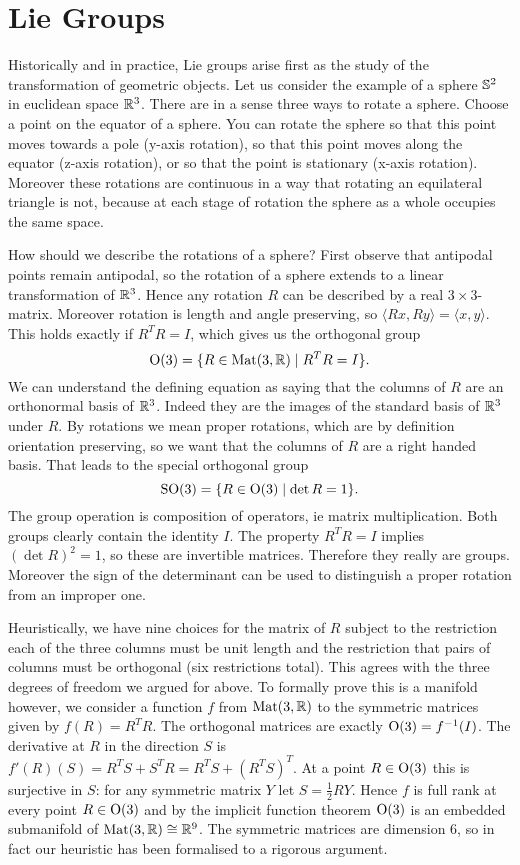 \chapter{Lie Groups}

Historically and in practice, Lie groups arise first as the study of the transformation of geometric objects.
Let us consider the example of a sphere $\mathbb{S}^2$ in euclidean space $\mathbb{R}^3$.
There are in a sense three ways to rotate a sphere.
Choose a point on the equator of a sphere.
You can rotate the sphere so that this point moves towards a pole (y-axis rotation), so that this point moves along the equator (z-axis rotation), or so that the point is stationary (x-axis rotation).
Moreover these rotations are continuous in a way that rotating an equilateral triangle is not, because at each stage of rotation the sphere as a whole occupies the same space.
 
How should we describe the rotations of a sphere?
First observe that antipodal points remain antipodal, so the rotation of a sphere extends to a linear transformation of $\mathbb{R}^3$.
Hence any rotation $R$ can be described by a real $3\times 3$-matrix.
Moreover rotation is length and angle preserving, so $\langle Rx, Ry \rangle = \langle x, y \rangle$.
This holds exactly if $R^TR = I$, which gives us the orthogonal group
\[
\mathrm{O}(3) = \{ R \in \operatorname{Mat}(3,\mathbb{R}) \mid R^TR = I \}.
\]
We can understand the defining equation as saying that the columns of $R$ are an orthonormal basis of $\mathbb{R}^3$.
Indeed they are the images of the standard basis of $\mathbb{R}^3$ under $R$.
By rotations we mean proper rotations, which are by definition orientation preserving, so we want that the columns of $R$ are a right handed basis.
That leads to the special orthogonal group
\[
\mathrm{SO}(3) = \{ R \in \mathrm{O}(3) \mid \det R = 1 \}.
\]
The group operation is composition of operators, ie matrix multiplication.
Both groups clearly contain the identity $I$.
The property $R^T R = I$ implies $(\det R)^2 = 1$, so these are invertible matrices.
Therefore they really are groups.
Moreover the sign of the determinant can be used to distinguish a proper rotation from an improper one.

Heuristically, we have nine choices for the matrix of $R$ subject to the restriction each of the three columns must be unit length and the restriction that pairs of columns must be orthogonal (six restrictions total).
This agrees with the three degrees of freedom we argued for above.
To formally prove this is a manifold however, we consider a function $f$ from $\operatorname{Mat}(3,\mathbb{R})$ to the symmetric matrices given by $f(R) = R^TR$.
The orthogonal matrices are exactly $\mathrm{O}(3) = f^{-1}(I)$.
The derivative at $R$ in the direction $S$ is $f'(R)(S) = R^TS + S^T R = R^T S + (R^T S)^T$.
At a point $R \in \mathrm{O}(3)$ this is surjective in $S$: for any symmetric matrix $Y$ let $S = \frac{1}{2}RY$.
Hence $f$ is full rank at every point $R \in \mathrm{O}(3)$ and by the implicit function theorem $\mathrm{O}(3)$ is an embedded submanifold of $\operatorname{Mat}(3,\mathbb{R}) \cong \mathbb{R}^9$.
The symmetric matrices are dimension $6$, so in fact our heuristic has been formalised to a rigorous argument.

